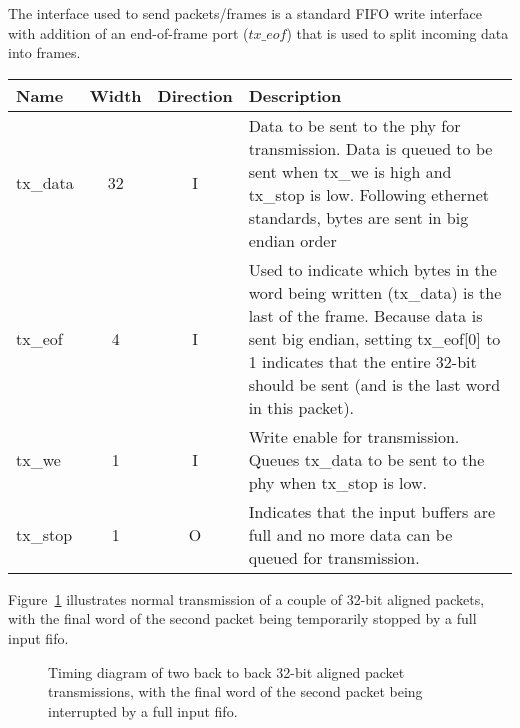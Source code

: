 \documentclass[11pt]{article}
\begin{document}
The interface used to send packets/frames is a standard FIFO write
interface with addition of an end-of-frame port ($tx\_eof$) that is
used to split incoming data into frames.

\vskip 12pt\noindent\begin{tabular}{p{0.85in}ccp{4.0in}}
\hline
Name & Width & Direction & Description \\
\hline

\hline tx\_data & 32 & I & Data to be sent to the phy for
transmission.  Data is queued to be sent when tx\_we is high and
tx\_stop is low.  Following ethernet standards, bytes are sent in big
endian order\\

\hline tx\_eof & 4 & I & Used to indicate which bytes in the word
being written (tx\_data) is the last of the frame.  Because data is
sent big endian, setting tx\_eof[0] to 1 indicates that the entire
32-bit should be sent (and is the last word in this packet). \\

\hline tx\_we & 1 & I & Write enable for transmission.  Queues
tx\_data to be sent to the phy when tx\_stop is low. \\

\hline tx\_stop & 1 & O & Indicates that the input buffers are full
and no more data can be queued for transmission. \\

\hline 
\end{tabular}\vskip 12pt

Figure~\ref{fig:timing-trans} illustrates normal transmission of a couple of
32-bit aligned packets, with the final word of the second packet being
temporarily stopped by a full input fifo.

\begin{figure}
\begin{timing}[2s]{0.6in}
  
  
    
  
\end{timing}
\caption{Timing diagram of two back to back 32-bit aligned packet
  transmissions, with the final word of the second packet being
  interrupted by a full input fifo.}
\label{fig:timing-trans}
\end{figure}
\end{document}
